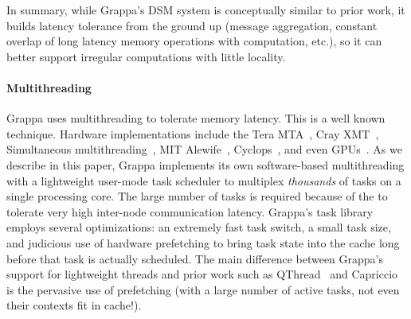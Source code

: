 In summary, while Grappa's DSM system is conceptually similar to prior work,
it builds latency tolerance from the ground up (message aggregation, constant
overlap of long latency memory operations with computation, etc.), so it can
better support irregular computations with little locality.




\paragraph{Multithreading} Grappa uses multithreading to tolerate memory
latency. This is a well known technique. Hardware implementations include the
Tera MTA~\cite{tera:mta1}, Cray XMT~\cite{feo:xmt}, Simultaneous
multithreading~\cite{tullsen:smt}, MIT Alewife~\cite{agarwal:alewife},
Cyclops~\cite{almasi:cyclops}, and even GPUs~\cite{gpus}. As we describe in
this paper, Grappa implements its own software-based multithreading with a
lightweight user-mode task scheduler to multiplex \emph{thousands\/} of tasks
on a single processing core. The large number of tasks is required because of
the to tolerate very high inter-node communication latency. Grappa's task
library employs several optimizations: an extremely fast task switch, a small
task size, and judicious use of hardware prefetching to bring task state into
the cache long before that task is actually scheduled. The main difference between Grappa's support for lightweight threads and prior work such as QThread~\cite{qt} and Capriccio~\cite{capriccion} is the pervasive use of prefetching (with a large number of active tasks, not even their contexts fit in cache!).

